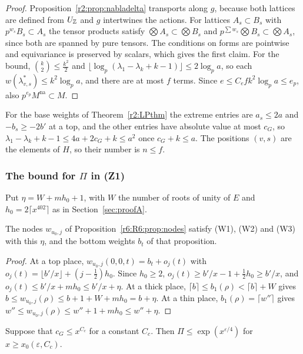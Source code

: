 \begin{proof}
Proposition~\ref{r2:prop:nabladelta} transports along $g$, because both lattices are defined from $U_\mathbb Z$ and $g$ intertwines the actions. For lattices $A_s\subset B_s$ with $p^{w_s}B_s\subset A_s$ the tensor products satisfy $\bigotimes A_s\subset\bigotimes B_s$ and $p^{\sum w_s}\bigotimes B_s\subset\bigotimes A_s$, since both are spanned by pure tensors. The conditions on forms are pointwise and equivariance is preserved by scalars, which gives the first claim. For the bound, $\binom k2\le\frac{k^2}2$ and $\lfloor\log_p(\lambda_1-\lambda_k+k-1)\rfloor\le2\log_pa$, so each $w(\lambda^*_{v,s})\le k^2\log_pa$, and there are at most $f$ terms. Since $e\le C_efk^2\log_pa\le e_p$, also $p^{e_p}M^{\mathrm{na}}\subset M$.
\end{proof}

For the base weights of Theorem~\ref{r2:LPthm} the extreme entries are $a_s\le2a$ and $-b_s\ge-2b'$ at a top, and the other entries have absolute value at most $c_G$, so $\lambda_1-\lambda_k+k-1\le4a+2c_G+k\le a^2$ once $c_G+k\le a$. The positions $(v,s)$ are the elements of $H$, so their number is $n\le f$.

\subsubsection{The bound for $\Pi$ in (Z1)}\label{r2:sec:Z1}

Put $\eta=W+mh_0+1$, with $W$ the number of roots of unity of $E$ and $h_0=2\lceil x^{402}\rceil$ as in Section~\ref{sec:proofA}.

\begin{lemma}\label{r2:lem:W123}
The nodes $w_{u_0,j}$ of Proposition~\ref{r6:R6:prop:nodes} satisfy (W1), (W2) and (W3) with this $\eta$, and the bottom weights $b_t$ of that proposition.
\end{lemma}

\begin{proof}
At a top place, $w_{u_0,j}(0,0,t)=b_t+o_j(t)$ with $o_j(t)=\lfloor b'/x\rfloor+(j-\frac12)h_0$. Since $h_0\ge2$, $o_j(t)\ge b'/x-1+\frac12h_0\ge b'/x$, and $o_j(t)\le b'/x+mh_0\le b'/x+\eta$. At a thick place, $\lceil b\rceil\le b_1(\rho)<\lceil b\rceil+W$ gives $b\le w_{u_0,j}(\rho)\le b+1+W+mh_0=b+\eta$. At a thin place, $b_1(\rho)=\lceil w''\rceil$ gives $w''\le w_{u_0,j}(\rho)\le w''+1+mh_0\le w''+\eta$.
\end{proof}

\begin{proposition}\label{r2:prop:Z1}
Suppose that $c_G\le x^{C_c}$ for a constant $C_c$. Then $\Pi\le\exp(x^{\varepsilon/4})$ for $x\ge x_0(\varepsilon,C_c)$.
\end{proposition}

